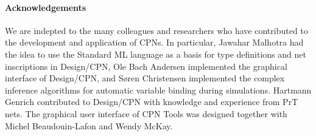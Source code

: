 \documentclass[nocopyrightspace]{sig-alternate}
\begin{document}






\paragraph*{Acknowledgements}  We are indepted to the many colleagues and researchers who have contributed to the development and application of CPNs. In particular, Jawahar Malhotra had the idea to use the Standard ML language
as a basis for type definitions and net inscriptions in Design/CPN,
Ole Bach Andersen implemented the graphical interface of Design/CPN,
and S\o{}ren Christensen implemented the complex inference algorithms
for automatic variable binding during simulations. Hartmann
Genrich contributed to Design/CPN with knowledge and experience from
PrT nets. The graphical user interface of CPN Tools was designed
together with Michel Beaudouin-Lafon and Wendy McKay.



\end{document}
